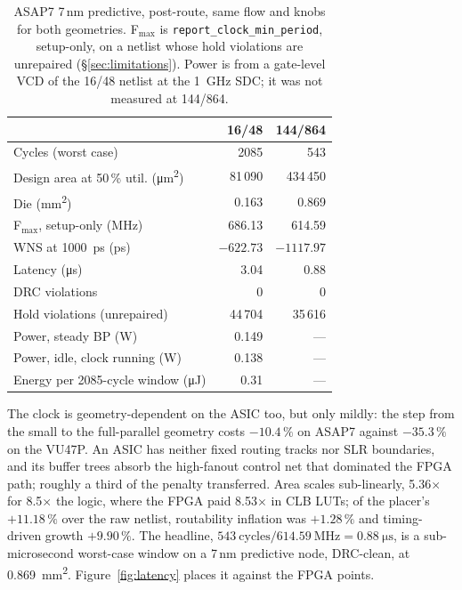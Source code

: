 \begin{table}[t]
  \centering
  \small
  \caption{ASAP7 7\,nm predictive, post-route, same flow and knobs for both
    geometries. F$_{\max}$ is \texttt{report\_clock\_min\_period}, setup-only,
    on a netlist whose hold violations are unrepaired (\S\ref{sec:limitations}).
    Power is from a gate-level VCD of the 16/48 netlist at the
    \SI{1}{\giga\hertz} SDC; it was not measured at 144/864.}
  \label{tab:asap7}
  \begin{tabular}{@{}lrr@{}}
    \toprule
    & 16/48 & 144/864 \\
    \midrule
    Cycles (worst case)                & 2085   & 543 \\
    Design area at 50\,\% util. (\si{\micro\metre\squared}) & 81\,090 & 434\,450 \\
    Die (\si{\milli\metre\squared})    & 0.163  & 0.869 \\
    F$_{\max}$, setup-only (MHz)       & 686.13 & 614.59 \\
    WNS at \SI{1000}{\pico\second} (ps) & $-622.73$ & $-1117.97$ \\
    Latency (\si{\micro\second})       & 3.04   & 0.88 \\
    DRC violations                     & 0      & 0 \\
    Hold violations (unrepaired)       & 44\,704 & 35\,616 \\
    \addlinespace
    Power, steady BP (W)               & 0.149  & --- \\
    Power, idle, clock running (W)     & 0.138  & --- \\
    Energy per 2085-cycle window (\si{\micro\joule}) & 0.31 & --- \\
    \bottomrule
  \end{tabular}
\end{table}

The clock is geometry-dependent on the ASIC too, but only mildly: the step from
the small to the full-parallel geometry costs $-10.4\,\%$ on ASAP7 against
$-35.3\,\%$ on the VU47P. An ASIC has neither fixed routing tracks nor SLR
boundaries, and its buffer trees absorb the high-fanout control net that
dominated the FPGA path; roughly a third of the penalty transferred. Area scales
sub-linearly, 5.36$\times$ for 8.5$\times$ the logic, where the FPGA paid
8.53$\times$ in CLB LUTs; of the placer's $+11.18\,\%$ over the raw netlist,
routability inflation was $+1.28\,\%$ and timing-driven growth $+9.90\,\%$.
The headline, $543\ \text{cycles} / \SI{614.59}{\mega\hertz} =
\SI{0.88}{\micro\second}$, is a sub-microsecond worst-case window on a 7\,nm
predictive node, DRC-clean, at \SI{0.869}{\milli\metre\squared}.
Figure~\ref{fig:latency} places it against the FPGA points.

